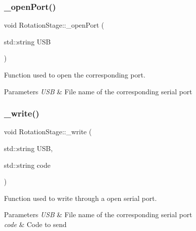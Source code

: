 \subsubsection{\texorpdfstring{\+\_\+open\+Port()}{\_openPort()}}
{\footnotesize\ttfamily void Rotation\+Stage\+::\+\_\+open\+Port (\begin{DoxyParamCaption}\item[{std\+::string}]{U\+SB }\end{DoxyParamCaption})\hspace{0.3cm}{\ttfamily [private]}}



Function used to open the corresponding port. 


\begin{DoxyParams}{Parameters}
{\em U\+SB} & File name of the corresponding serial port \\
\hline
\end{DoxyParams}
\mbox{\label{class_rotation_stage_afb2393a3cac78176407e8e2d31a6cef4}} 
\subsubsection{\texorpdfstring{\+\_\+write()}{\_write()}}
{\footnotesize\ttfamily void Rotation\+Stage\+::\+\_\+write (\begin{DoxyParamCaption}\item[{std\+::string}]{U\+SB,  }\item[{std\+::string}]{code }\end{DoxyParamCaption})\hspace{0.3cm}{\ttfamily [private]}}



Function used to write through a open serial port. 


\begin{DoxyParams}{Parameters}
{\em U\+SB} & File name of the corresponding serial port \\
\hline
{\em code} & Code to send \\
\hline
\end{DoxyParams}
\mbox{\label{class_rotation_stage_a999761588e3c6a2b2c94f9e5d03b42f2}} 
